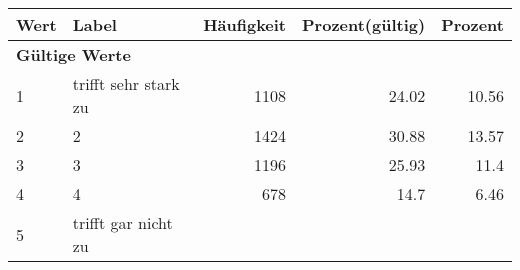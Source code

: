      \begin{longtable}{lXrrr}
     \toprule
     \textbf{Wert} & \textbf{Label} & \textbf{Häufigkeit} & \textbf{Prozent(gültig)} & \textbf{Prozent} \\
     \endhead
     \midrule
     \multicolumn{5}{l}{\textbf{Gültige Werte}}\\

     1 &
     \multicolumn{1}{X}{ trifft sehr stark zu   } &


       \num{1108} &
       \num[round-mode=places,round-precision=2]{24,02} &
         \num[round-mode=places,round-precision=2]{10,56} \\

     2 &
     \multicolumn{1}{X}{ 2   } &


       \num{1424} &
       \num[round-mode=places,round-precision=2]{30,88} &
         \num[round-mode=places,round-precision=2]{13,57} \\

     3 &
     \multicolumn{1}{X}{ 3   } &


       \num{1196} &
       \num[round-mode=places,round-precision=2]{25,93} &
         \num[round-mode=places,round-precision=2]{11,4} \\

     4 &
     \multicolumn{1}{X}{ 4   } &


       \num{678} &
       \num[round-mode=places,round-precision=2]{14,7} &
         \num[round-mode=places,round-precision=2]{6,46} \\

     5 &
     \multicolumn{1}{X}{ trifft gar nicht zu   } &



\end{longtable}
